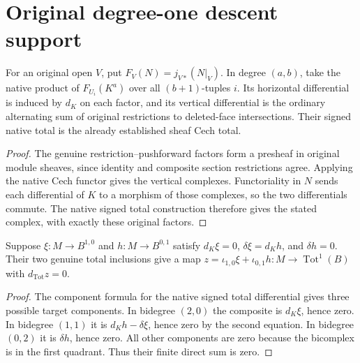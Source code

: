 \section{Original degree-one descent support}
\label{sec:di-reused-degree-one-support}

\begin{definition}
\label{def:di-original-sheaf-cech-total-target}
\leanok
For an original open $V$, put $F_V(N)=j_{V*}(N|_V)$. In degree $(a,b)$,
take the native product of $F_{U_i}(K^a)$ over all $(b+1)$-tuples $i$.
Its horizontal differential is induced by $d_K$ on each factor, and its
vertical differential is the ordinary alternating sum of original
restrictions to deleted-face intersections. Their signed native total is
the already established sheaf Cech total.
\end{definition}
\begin{proof}
\leanok
The genuine restriction--pushforward factors form a presheaf in original
module sheaves, since identity and composite section restrictions agree.
Applying the native Cech functor gives the vertical complexes. Functoriality
in $N$ sends each differential of $K$ to a morphism of those complexes,
so the two differentials commute. The native signed total construction
therefore gives the stated complex, with exactly these original factors.
\end{proof}

\begin{lemma}
\label{lem:di-cech-degree-one-total-cycle}
\leanok
{}
Suppose $\xi:M\to B^{1,0}$ and $h:M\to B^{0,1}$ satisfy
$d_K\xi=0$, $\delta\xi=d_Kh$, and $\delta h=0$.
Their two genuine total inclusions give a map
$z=\iota_{1,0}\xi+\iota_{0,1}h:M\to\operatorname{Tot}^1(B)$
with $d_{\mathrm{Tot}}z=0$.
\end{lemma}
\begin{proof}
\leanok
The component formula for the native signed total differential gives
three possible target components. In bidegree $(2,0)$ the composite is
$d_K\xi$, hence zero. In bidegree $(1,1)$ it is
$d_Kh-\delta\xi$, hence zero by the second equation. In bidegree $(0,2)$
it is $\delta h$, hence zero. All other components are zero because the
bicomplex is in the first quadrant. Thus their finite direct sum is zero.
\end{proof}

